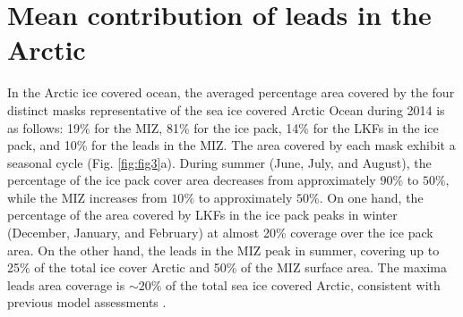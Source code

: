 \documentclass[lineno,sn-basic]{sn-jnl}%
\begin{document}
\section{Mean contribution of leads in the Arctic}\label{sec3}

In the Arctic ice covered ocean, the averaged percentage area covered by the four distinct masks representative of the sea ice covered Arctic Ocean during 2014 is as follows: 19\% for the MIZ, 81\% for the ice pack, 14\% for the LKFs in the ice pack, and 10\% for the leads in the MIZ. 
The area covered by each mask exhibit a seasonal cycle (Fig. \ref{fig:fig3}a). During summer (June, July, and August), the percentage of the ice pack cover area decreases from approximately $90\%$ to $50\%$, while the MIZ increases from $10\%$ to approximately $50\%$. 
On one hand, the percentage of the area covered by LKFs in the ice pack peaks in winter (December, January, and February) at almost 20\% coverage over the ice pack area. On the other hand, the leads in the MIZ peak in summer, covering up to 25\% of the total ice cover Arctic and 50\% of the MIZ surface area. The maxima leads area coverage is $\sim 20\%$ of the total sea ice covered Arctic, consistent with previous model assessments \citep{Wang_leads_2016}. 
\end{document}
